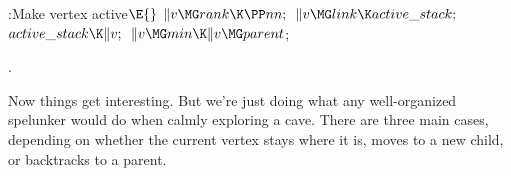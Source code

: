 \B{}:Make vertex  active\X${}\E{}$\6
$\|v\MG\\{rank}\K\PP\\{nn};{}$\6
${}\|v\MG\\{link}\K\\{active\_stack};{}$\6
${}\\{active\_stack}\K\|v;{}$\6
${}\|v\MG\\{min}\K\|v\MG\\{parent}{}$;\par
{}.\fi

Now things get interesting. But we're just doing what any well-organized
spelunker would do when calmly exploring a cave.
There are three main cases,
depending on whether the current vertex stays where it is, moves
to a new child, or backtracks to a parent.

